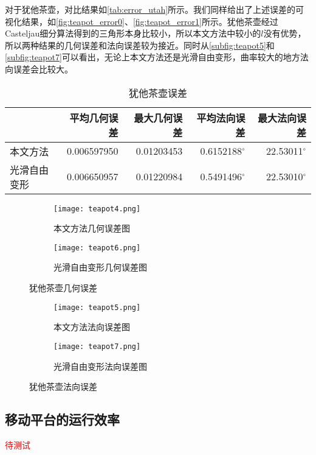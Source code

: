 对于犹他茶壶，对比结果如\autoref{tab:error_utah}所示。我们同样给出了上述误差的可视化结果，如\autoref{fig:teapot_error0}、\autoref{fig:teapot_error1}所示。犹他茶壶经过Casteljau细分算法得到的三角形本身比较小，所以本文方法中较小的$l$没有优势，所以两种结果的几何误差和法向误差较为接近。同时从\autoref{subfig:teapot5}和\autoref{subfig:teapot7}可以看出，无论上本文方法还是光滑自由变形，曲率较大的地方法向误差会比较大。

\begin{table}[htbp]
    \centering
    \begin{tabular}{lrrrr}
    \toprule
        & 平均几何误差 & 最大几何误差 & 平均法向误差 & 最大法向误差 \\
    \midrule
        本文方法    & \num{0.006597950} & \num{0.01203453} & \num[scientific-notation=false]{0.6152188}$^\circ$ & \num[scientific-notation=false]{22.53011}$^\circ$ \\
        光滑自由变形& \num{0.006650957} & \num{0.01220984} & \num[scientific-notation=false]{0.5491496}$^\circ$ & \num[scientific-notation=false]{22.53010}$^\circ$ \\
    \bottomrule
    \end{tabular}
    \caption{犹他茶壶误差} \label{tab:error_utah}
\end{table}

\begin{figure}[htbp]
	\centering
	\begin{subfigure}[b]{.45\textwidth}
		\centering
		\texttt{[image: teapot4.png]}
		\caption{本文方法几何误差图}\label{subfig:teapot4}
	\end{subfigure}%
	\begin{subfigure}[b]{.45\textwidth}
		\centering
		\texttt{[image: teapot6.png]}
		\caption{光滑自由变形几何误差图}\label{subfig:teapot6}
	\end{subfigure}
	\caption{犹他茶壶几何误差}\label{fig:teapot_error0}
\end{figure}
\begin{figure}[htbp]
	\centering
	\begin{subfigure}[b]{.45\textwidth}
		\centering
		\texttt{[image: teapot5.png]}
		\caption{本文方法法向误差图}\label{subfig:teapot5}
	\end{subfigure}%
	\begin{subfigure}[b]{.45\textwidth}
		\centering
		\texttt{[image: teapot7.png]}
		\caption{光滑自由变形法向误差图}\label{subfig:teapot7}
	\end{subfigure}
	\caption{犹他茶壶法向误差}\label{fig:teapot_error1}
\end{figure}

\subsection{移动平台的运行效率}
\textcolor{red}{待测试}
